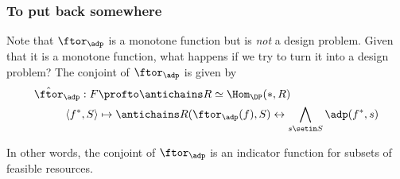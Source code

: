 \subsubsection{To put back somewhere}
Note that $\ftor_\adp$ is a monotone function but is \emph{not} a design problem.
Given that it is a monotone function, what happens if we try to turn it into a design problem?
The conjoint of $\ftor_\adp$ is given by
\begin{equation*}
    \begin{aligned}
        \hat \ftor_\adp : F    & \profto \antichains R \simeq \Hom_\DP(\ast, R) \\
        \langle f^*, S \rangle & \mapsto \antichains R(\ftor_\adp(f), S) \leftrightarrow \bigwedge_{s\setin S} \adp(f^*, s)
    \end{aligned}
\end{equation*}

In other words, the conjoint of $\ftor_\adp$ is an indicator function for subsets of feasible resources.
